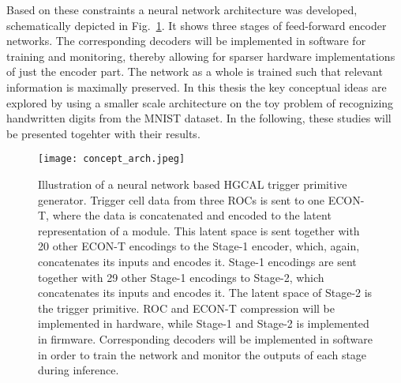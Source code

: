 \documentclass[../../main.tex]{subfiles}
\begin{document}
Based on these constraints a neural network architecture was developed, schematically depicted in Fig.~\ref{fig:conc_arch}. It shows three stages of feed-forward encoder networks. The corresponding decoders will be implemented in software for training and monitoring, thereby allowing for sparser hardware implementations of just the encoder part. The network as a whole is trained such that relevant information is maximally preserved. In this thesis the key conceptual ideas are explored by using a smaller scale architecture on the toy problem of recognizing handwritten digits from the MNIST dataset. In the following, these studies will be presented togehter with their results.\\
\begin{figure}[htp]
			\begin{center}
				\texttt{[image: concept\_arch.jpeg]}
				\caption{Illustration of a neural network based HGCAL trigger primitive generator. Trigger cell data from three ROCs is sent to one ECON-T, where the data is concatenated and encoded to the latent representation of a module. This latent space is sent together with 20 other ECON-T encodings to the Stage-1 encoder, which, again, concatenates its inputs and encodes it. Stage-1 encodings are sent together with 29 other Stage-1 encodings to Stage-2, which concatenates its inputs and encodes it. The latent space of Stage-2 is the trigger primitive. ROC and ECON-T compression will be implemented in hardware, while Stage-1 and Stage-2 is implemented in firmware. Corresponding decoders will be implemented in software in order to train the network and monitor the outputs of each stage during inference.}
				\label{fig:conc_arch}
			\end{center}
\end{figure}
\end{document}
